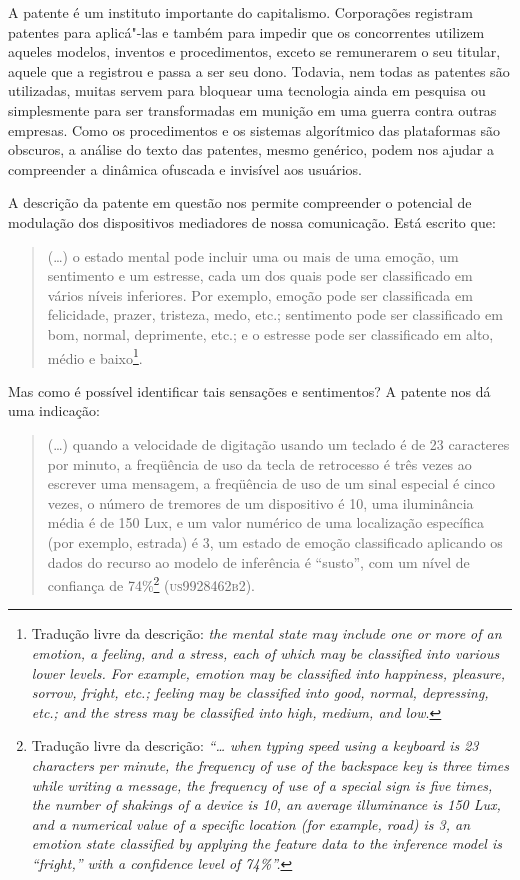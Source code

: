 A patente é um instituto importante do capitalismo. Corporações
registram patentes para aplicá"-las e também para impedir que os
concorrentes utilizem aqueles modelos, inventos e procedimentos, exceto
se remunerarem o seu titular, aquele que a registrou e passa a ser seu
dono. Todavia, nem todas as patentes são utilizadas, muitas servem para
bloquear uma tecnologia ainda em pesquisa ou simplesmente para ser
transformadas em munição em uma guerra contra outras empresas. Como os
procedimentos e os sistemas algorítmico das plataformas são obscuros, a
análise do texto das patentes, mesmo genérico, podem nos ajudar a
compreender a dinâmica ofuscada e invisível aos usuários.

A descrição da patente em questão nos permite compreender o potencial de
modulação dos dispositivos mediadores de nossa comunicação. Está escrito
que:

\begin{quote}
(\ldots{}) o estado mental pode incluir uma ou mais de uma emoção, um
sentimento e um estresse, cada um dos quais pode ser classificado em
vários níveis inferiores. Por exemplo, emoção pode ser classificada em
felicidade, prazer, tristeza, medo, etc.; sentimento pode ser
classificado em bom, normal, deprimente, etc.; e o estresse pode ser
classificado em alto, médio e baixo\footnote{Tradução livre da
  descrição: \emph{the mental state may include one or more of an emotion, a
    feeling, and a stress, each of which may be classified into various
    lower levels. For example, emotion may be classified into happiness,
    pleasure, sorrow, fright, etc.; feeling may be classified into good,
    normal, depressing, etc.; and the stress may be classified into high,
    medium, and low}.}.
\end{quote}

Mas como é possível identificar tais sensações e sentimentos? A patente
nos dá uma indicação:

\begin{quote}
(\ldots{}) quando a velocidade de digitação usando um teclado é de 23
caracteres por minuto, a freqüência de uso da tecla de retrocesso é três
vezes ao escrever uma mensagem, a freqüência de uso de um sinal especial
é cinco vezes, o número de tremores de um dispositivo é 10, uma
iluminância média é de 150 Lux, e um valor numérico de uma localização
específica (por exemplo, estrada) é 3, um estado de emoção classificado
aplicando os dados do recurso ao modelo de inferência é ``susto'', com
um nível de confiança de 74\%\footnote{Tradução livre da descrição:
  \emph{``\ldots{} when typing speed using a keyboard is 23 characters per
    minute, the frequency of use of the backspace key is three times while
    writing a message, the frequency of use of a special sign is five
    times, the number of shakings of a device is 10, an average
    illuminance is 150 Lux, and a numerical value of a specific location
    (for example, road) is 3, an emotion state classified by applying the
    feature data to the inference model is ``fright,'' with a confidence
    level of 74\%''.}} (\textsc{us9928462b2}).
\end{quote}

